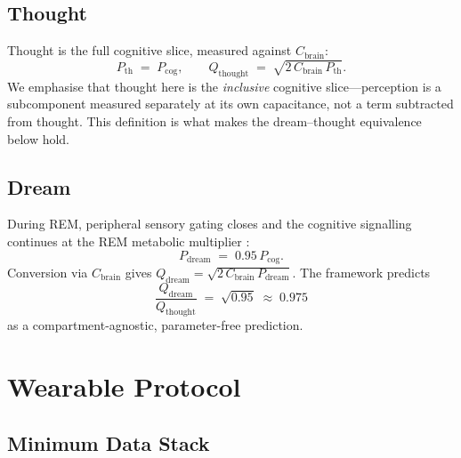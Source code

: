 \documentclass[11pt,twocolumn,a4paper]{article}
\theoremstyle{definition}
\theoremstyle{remark}
\newcommand{\Qth}{Q_{\mathrm{thought}}}
\newcommand{\Qdr}{Q_{\mathrm{dream}}}
\newcommand{\Pcog}{P_{\mathrm{cog}}}
\newcommand{\Pth}{P_{\mathrm{th}}}
\newcommand{\Pdr}{P_{\mathrm{dream}}}
\newcommand{\Cbrain}{C_{\mathrm{brain}}}
\begin{document}
\subsection{Thought}

Thought is the full cognitive slice, measured against $\Cbrain$:
\begin{equation}
\Pth \;=\; \Pcog,\qquad \Qth \;=\; \sqrt{2\,\Cbrain\,\Pth}.
\label{eq:Qthought}
\end{equation}
We emphasise that thought here is the \emph{inclusive} cognitive
slice---perception is a subcomponent measured separately at its own
capacitance, not a term subtracted from thought. This definition is
what makes the dream--thought equivalence below hold.

\subsection{Dream}

During REM, peripheral sensory gating closes
\citep{llinas1993,rechtschaffen1968} and the cognitive signalling
continues at the REM metabolic multiplier
\citep{maquet1990,madsen1991}:
\begin{equation}
\Pdr \;=\; 0.95\,\Pcog.
\label{eq:Pdream}
\end{equation}
Conversion via $\Cbrain$ gives
$\Qdr = \sqrt{2\,\Cbrain\,\Pdr}$. The framework predicts
\begin{equation}
\boxed{\;\frac{\Qdr}{\Qth} \;=\; \sqrt{0.95} \;\approx\; 0.975\;}
\end{equation}
as a compartment-agnostic, parameter-free prediction.

\section{Wearable Protocol}
\label{sec:protocol}

\subsection{Minimum Data Stack}
\end{document}
